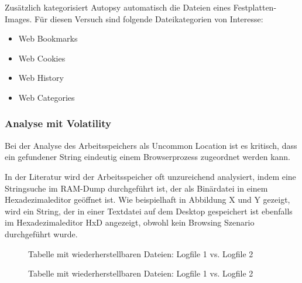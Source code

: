 Zusätzlich kategorisiert Autopsy automatisch die Dateien eines Festplatten-Images. Für diesen Versuch sind folgende Dateikategorien von Interesse:
\begin{itemize}
\item Web Bookmarks
\item Web Cookies
\item Web History
\item Web Categories
\end{itemize}


\subsubsection*{Analyse mit Volatility}
\label{subsubsection:methodik-datenanalyse-uncommonlocations-analysemitvolatility}
Bei der Analyse des Arbeitsspeichers als Uncommon Location ist es kritisch, dass ein gefundener String eindeutig einem Browserprozess zugeordnet werden kann. 

In der Literatur wird der Arbeitsspeicher oft unzureichend analysiert, indem eine Stringsuche im RAM-Dump durchgeführt ist, der als Binärdatei in einem Hexadezimaleditor geöffnet ist. \cite{Rochmadi.2017, Md.2018, Montasari.2015}
Wie beispielhaft in Abbildung X und Y gezeigt, wird ein String, der in einer Textdatei auf dem Desktop gespeichert ist ebenfalls im Hexadezimaleditor HxD angezeigt, obwohl kein Browsing Szenario durchgeführt wurde.
\begin{figure}[h!]
	\centerline{}
	\caption{Tabelle mit wiederherstellbaren Dateien: Logfile 1 vs. Logfile 2}
\end{figure}
\begin{figure}[h!]
	\caption{Tabelle mit wiederherstellbaren Dateien: Logfile 1 vs. Logfile 2}
\end{figure}

